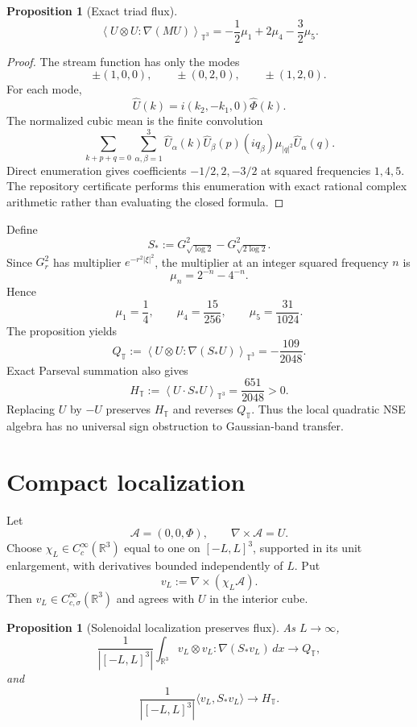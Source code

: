 \documentclass[11pt]{article}
\newtheorem{proposition}[theorem]{Proposition}
\theoremstyle{remark}
\newcommand{\R}{\mathbb R}
\newcommand{\T}{\mathbb T}
\begin{document}
\begin{proposition}[Exact triad flux]
\[
\boxed{
 \left\langle
 U\otimes U:\nabla(MU)
 \right\rangle_{\T^3}
 =
 -\frac12\mu_1+2\mu_4-\frac32\mu_5.
}
\]
\end{proposition}

\begin{proof}
The stream function has only the modes
\[
 \pm(1,0,0),\qquad
 \pm(0,2,0),\qquad
 \pm(1,2,0).
\]
For each mode,
\[
 \widehat U(k)
 =
 i(k_2,-k_1,0)\widehat\Phi(k).
\]
The normalized cubic mean is the finite convolution
\[
 \sum_{k+p+q=0}
 \sum_{\alpha,\beta=1}^3
 \widehat U_\alpha(k)
 \widehat U_\beta(p)
 (iq_\beta)\mu_{|q|^2}
 \widehat U_\alpha(q).
\]
Direct enumeration gives coefficients
\(-1/2,2,-3/2\) at squared frequencies \(1,4,5\).
The repository certificate performs this enumeration with exact rational
complex arithmetic rather than evaluating the closed formula.
\end{proof}

Define
\[
 S_*
 :=
 G_{\sqrt{\log2}}^2-G_{\sqrt{2\log2}}^2.
\]
Since \(G_r^2\) has multiplier \(e^{-r^2|\xi|^2}\), the multiplier at an
integer squared frequency \(n\) is
\[
 \mu_n=2^{-n}-4^{-n}.
\]
Hence
\[
 \mu_1=\frac14,\qquad
 \mu_4=\frac{15}{256},\qquad
 \mu_5=\frac{31}{1024}.
\]
The proposition yields
\[
\boxed{
 Q_{\T}
 :=
 \left\langle
 U\otimes U:\nabla(S_*U)
 \right\rangle_{\T^3}
 =
 -\frac{109}{2048}.
}
\]
Exact Parseval summation also gives
\[
\boxed{
 H_{\T}
 :=
 \left\langle U\cdot S_*U\right\rangle_{\T^3}
 =
 \frac{651}{2048}>0.
}
\]
Replacing \(U\) by \(-U\) preserves \(H_{\T}\) and reverses \(Q_{\T}\).
Thus the local quadratic NSE algebra has no universal sign obstruction to
Gaussian-band transfer.

\section{Compact localization}

Let
\[
 \mathcal A=(0,0,\Phi),
 \qquad
 \nabla\times\mathcal A=U.
\]
Choose \(\chi_L\in C_c^\infty(\R^3)\) equal to one on \([-L,L]^3\),
supported in its unit enlargement, with derivatives bounded independently
of \(L\).  Put
\[
 v_L:=\nabla\times(\chi_L\mathcal A).
\]
Then \(v_L\in C^\infty_{c,\sigma}(\R^3)\) and agrees with \(U\) in the
interior cube.

\begin{proposition}[Solenoidal localization preserves flux]
As \(L\to\infty\),
\[
 \frac1{|[-L,L]^3|}
 \int_{\R^3}
 v_L\otimes v_L:\nabla(S_*v_L)\,dx
 \longrightarrow Q_{\T},
\]
and
\[
 \frac1{|[-L,L]^3|}
 \langle v_L,S_*v_L\rangle
 \longrightarrow H_{\T}.
\]
\end{proposition}
\end{document}

